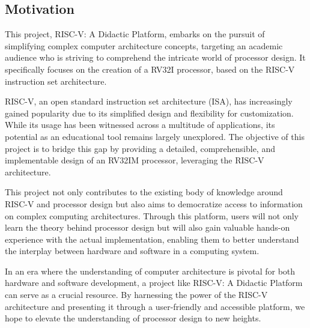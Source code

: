 \subsection{Motivation}
This project, RISC-V: A Didactic Platform, embarks on the pursuit of simplifying complex computer architecture concepts, 
targeting an academic audience who is striving to comprehend the intricate world of processor design. 
It specifically focuses on the creation of a RV32I processor, based on the RISC-V instruction set architecture.

RISC-V, an open standard instruction set architecture (ISA), has increasingly gained popularity due to its simplified design and 
flexibility for customization. While its usage has been witnessed across a multitude of applications, its potential as an educational tool remains largely unexplored. 
The objective of this project is to bridge this gap by providing a detailed, comprehensible, and implementable design of an RV32IM processor, leveraging the RISC-V architecture.

This project not only contributes to the existing body of knowledge around RISC-V and processor design but also aims to democratize access to information on complex computing architectures. 
Through this platform, users will not only learn the theory behind processor design but will also gain valuable hands-on experience with the actual implementation, 
enabling them to better understand the interplay between hardware and software in a computing system.

In an era where the understanding of computer architecture is pivotal for both hardware and software development, 
a project like RISC-V: A Didactic Platform can serve as a crucial resource. 
By harnessing the power of the RISC-V architecture and presenting it through a user-friendly and accessible platform, 
we hope to elevate the understanding of processor design to new heights.